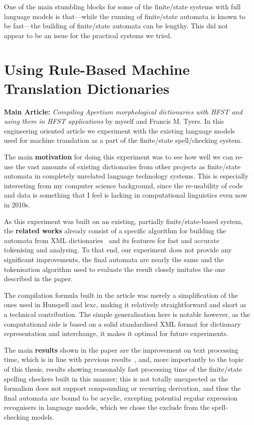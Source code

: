 \documentclass[officiallayout]{unihelcompling}
\begin{document}
One of the main stumbling blocks for some of the finite\-/state systems with full
language models is that---while the running of finite\-/state automata is known
to be fast---the building of finite\-/state automata can be lengthy. This did
not appear to be an issue for the practical systems we tried.


\section{Using Rule-Based Machine Translation Dictionaries}
\label{sec:apertium}

\textbf{Main Article:} \emph{Compiling Apertium morphological dictionaries with
HFST and using them in HFST applications} by myself and Francis M. Tyers. In
this engineering oriented article we experiment with the existing language
models used for machine translation as a part of the finite\-/state
spell\-/checking system.

The main \textbf{motivation} for doing this experiment was to see how well we
can re-use the vast amounts of existing dictionaries from other projects as
finite\-/state automata in completely unrelated language technology systems.
This is especially interesting from my computer science background, since
the re-usability of code and data is something that I feel is lacking in
computational linguistics even now in 2010s.

As this experiment was built on an existing, partially finite\-/state-based
system, the \textbf{related works} already consist of a specific algorithm for
building the automata from XML dictionaries~\citep{rojas2005construccion} and
its features for fast and accurate tokenising and analysing. To that end, our
experiment does not provide any significant improvements, the final automata
are nearly the same and the tokenisation algorithm used to evaluate the result
closely imitates the one described in the paper.

The compilation formula built in the article was merely a simplification of
the ones used in Hunspell and lexc, making it relatively straightforward and
short as a technical contribution. The simple generalisation here is notable
however, as the computational side is based on a solid standardised XML
format for dictionary representation and interchange, it makes it optimal
for future experiments.

The main \textbf{results} shown in the paper are the improvement on text
processing time, which is in line with previous
results~\citep{silfverberg2009hfst}, and, more importantly to the topic of this
thesis, results showing reasonably fast processing time of the finite\-/state
spelling checkers built in this manner; this is not totally unexpected as the
formalism does not support compounding or recurring derivation, and thus the
final automata are bound to be acyclic, excepting potential regular
expression recognisers in language models, which we chose the exclude from
the spell-checking models.
\end{document}
